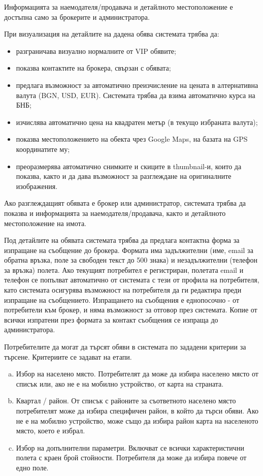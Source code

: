 \documentclass[]{article}
\begin{document}
\begin{enumerate}[I.]
{Информацията за наемодателя/продавача и детайлното местоположение е достъпна само за брокерите и администратора.


При визуализация на детайлите на дадена обява системата трябва да:
	\begin{itemize}
	\item разграничава визуално нормалните от VIP обявите;
	\item показва контактите на брокера, свързан с обявата;
	\item предлага възможност за автоматично преизчисление на цената в алтернативна валута (BGN, USD, EUR).	Системата трябва да взима автоматично курса на БНБ;
	\item изчислява автоматично цена на квадратен метър (в текущо избраната валута);
	\item показва местоположението на обекта чрез Google Maps, на базата на GPS координатите му;
	\item преоразмерява автоматично снимките и скиците в thumbnail-и, които да показва, както и да дава възможност за разглеждане на оригиналните изображения.
	\end{itemize}
				
Ако разглеждащият обявата е брокер или администратор, системата трябва да показва и информацията за наемодателя/продавача, както и детайлното местоположение на имота.
				
Под детайлите на обявата системата трябва да предлага контактна форма за изпращане на съобщение до брокера. Формата има задължителни (име, email за обратна връзка, поле за свободен текст до 500 знака) и незадължителни (телефон за връзка) полета. Ако текущият потребител е регистриран, полетата email и телефон се попълват автоматично от системата с тези от профила на потребителя, като системата осигурява възможност на потребителя да ги редактира преди изпращане на съобщението. Изпращането на съобщения е еднопосочно - от потребители към брокер, и няма възможност за отговор през системата. Копие от всички изпратени през формата за контакт съобщения се изпраща до администратора.


Потребителите да могат да търсят обяви в системата по зададени критерии за търсене. Критериите се задават на етапи.
\begin{enumerate}[a) ]
\item Избор на населено място. Потребителят да може да избира населено място от списък  или, ако не е на мобилно устройство, от карта на страната. 
\item Квартал / район. От списък с районите за съответното населено място потребителят може да избира специфичен район, в който да търси обяви. Ако не е на мобилно устройство, може също да избира район карта на населеното място, което е избрал.
\item Избор на допълнителни параметри. Включват се всички характеристични полета с краен брой стойности. Потребителя да може да избира повече от едно поле.
\end{enumerate}

}
\end{enumerate}
\end{document}
